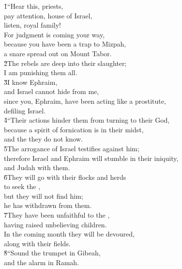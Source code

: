 \begin{poetry}
\poeml {}
\v{1}``Hear this, priests, \\
\poemll    pay attention, house of Israel, \\
\poemlll       listen, royal family! \\
\poeml For judgment is coming your way, \\
\poemll    because you have been a trap to Mizpah, \\
\poemlll       a snare spread out on Mount Tabor. \\
\poeml \v{2}The rebels are deep into their slaughter; \\
\poemll    I am punishing them all. \\
\poeml \v{3}I know Ephraim, \\
\poemll    and Israel cannot hide from me, \\
\poeml since you, Ephraim, have been acting like a prostitute, \\
\poemll    defiling Israel. \\
\poeml \v{4}``Their actions hinder them from turning to their God, \\
\poemll    because a spirit of fornication is in their midst, \\
\poemlll       and the  they do not know. \\
\poeml \v{5}The arrogance of Israel testifies against him; \\
\poemll    therefore Israel and Ephraim will stumble in their iniquity, \\
\poemlll       and Judah with them. \\
\poeml \v{6}They will go with their flocks and herds \\
\poemll    to seek the , \\
\poeml but they will not find him; \\
\poemll    he has withdrawn from them. \\
\poeml \v{7}They have been unfaithful to the , \\
\poemll    having raised unbelieving children. \\
\poeml In the coming month they will be devoured, \\
\poemll    along with their fields. \\
\poeml \v{8}``Sound the trumpet in Gibeah, \\
\poemll    and the alarm in Ramah. \\

\end{poetry}
